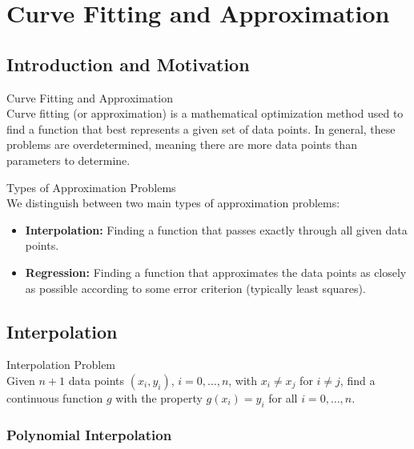 \raggedcolumns

\section{Curve Fitting and Approximation}

\subsection{Introduction and Motivation}

\begin{definition}{Curve Fitting and Approximation}\\
Curve fitting (or approximation) is a mathematical optimization method used to find a function that best represents a given set of data points. In general, these problems are overdetermined, meaning there are more data points than parameters to determine.
\end{definition}

\begin{concept}{Types of Approximation Problems}\\
We distinguish between two main types of approximation problems:

\begin{itemize}
    \item \textbf{Interpolation:} Finding a function that passes exactly through all given data points.
    \item \textbf{Regression:} Finding a function that approximates the data points as closely as possible according to some error criterion (typically least squares).
\end{itemize}
\end{concept}

\subsection{Interpolation}

\begin{definition}{Interpolation Problem}\\
Given $n+1$ data points $(x_i, y_i)$, $i=0,\ldots,n$, with $x_i \neq x_j$ for $i \neq j$, find a continuous function $g$ with the property $g(x_i) = y_i$ for all $i=0,\ldots,n$.
\end{definition}

\subsubsection{Polynomial Interpolation}


